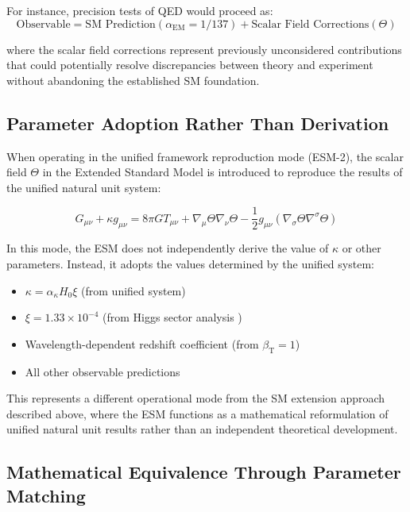 \documentclass[12pt,a4paper]{article}
\newcommand{\alphaEM}{\alpha_{\text{EM}}}
\newcommand{\betaT}{\beta_{\text{T}}}
\newcommand{\xipar}{\xi}
\begin{document}
	For instance, precision tests of QED would proceed as:
	\begin{equation}
		\text{Observable} = \text{SM Prediction}(\alphaEM = 1/137) + \text{Scalar Field Corrections}(\Theta)
	\end{equation}
	
	where the scalar field corrections represent previously unconsidered contributions that could potentially resolve discrepancies between theory and experiment without abandoning the established SM foundation.
	
	\subsection{Parameter Adoption Rather Than Derivation}
	\label{subsec:parameter_adoption}
	
	When operating in the unified framework reproduction mode (ESM-2), the scalar field $\Theta$ in the Extended Standard Model is introduced to reproduce the results of the unified natural unit system:
	
	\begin{equation}
		G_{\mu\nu} + \kappa g_{\mu\nu} = 8\pi G T_{\mu\nu} + \nabla_{\mu}\Theta\nabla_{\nu}\Theta - \frac{1}{2}g_{\mu\nu}(\nabla_{\sigma}\Theta\nabla^{\sigma}\Theta)
	\end{equation}
	
	In this mode, the ESM does not independently derive the value of $\kappa$ or other parameters. Instead, it adopts the values determined by the unified system:
	
	\begin{itemize}
		\item $\kappa = \alpha_\kappa H_0 \xipar$ (from unified system)
		\item $\xipar = 1.33 \times 10^{-4}$ (from Higgs sector analysis \cite{pascher_beta_derivation_2025})
		\item Wavelength-dependent redshift coefficient (from $\betaT = 1$)
		\item All other observable predictions
	\end{itemize}
	
	This represents a different operational mode from the SM extension approach described above, where the ESM functions as a mathematical reformulation of unified natural unit results rather than an independent theoretical development.
	
	\subsection{Mathematical Equivalence Through Parameter Matching}
	\label{subsec:mathematical_equivalence_parameters}
	
\end{document}
